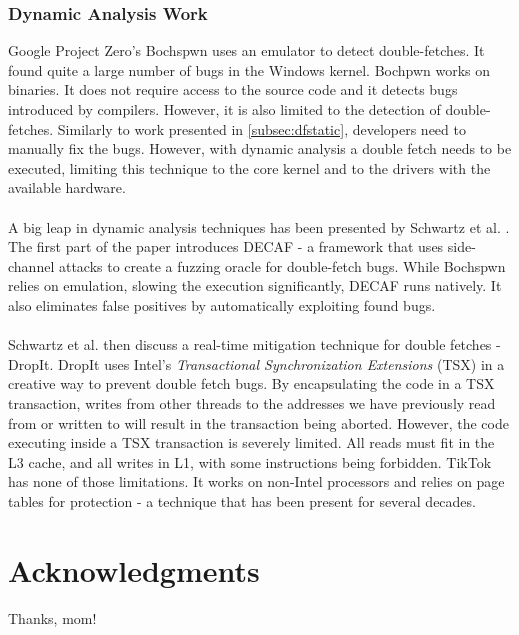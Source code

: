 \subsubsection{Dynamic Analysis Work}
Google Project Zero's Bochspwn \cite{jurczyk2013bochspwn} uses an emulator to
detect double-fetches. It found quite a large number of bugs in the Windows
kernel. Bochpwn works on binaries. It does not require access to the source code
and it detects bugs introduced by compilers. However, it is also limited to the
detection of double-fetches. Similarly to work presented in 
\cref{subsec:dfstatic}, developers need to manually fix the bugs. However, with
dynamic analysis a double fetch needs to be executed, limiting this
technique to the core kernel and to the drivers with the available hardware.
\\
\\
A big leap in dynamic analysis techniques has been presented by Schwartz et al.
\cite{schwarz2018automated}. The first part of the paper introduces DECAF - a
framework that uses side-channel attacks to create a fuzzing oracle for
double-fetch bugs. While Bochspwn relies on emulation, slowing the execution
significantly, DECAF runs natively. It also eliminates false positives by
automatically exploiting found bugs.
\\
\\
Schwartz et al. then discuss a real-time mitigation technique for double
fetches - DropIt. DropIt uses Intel's \emph{Transactional Synchronization 
Extensions} (TSX)\cite{intel64and} in a creative way to prevent double fetch
bugs. By encapsulating the code in a TSX transaction, writes from other threads
to the addresses we have previously read from or written to will result in the
transaction being aborted. However, the code executing inside a TSX transaction
is severely limited. All reads must fit in the L3 cache, and all writes in L1,
with some instructions being forbidden. TikTok has none of those limitations.
It works on non-Intel processors and relies on page tables for protection - a
technique that has been present for several decades.


\section*{Acknowledgments}

Thanks, mom!

